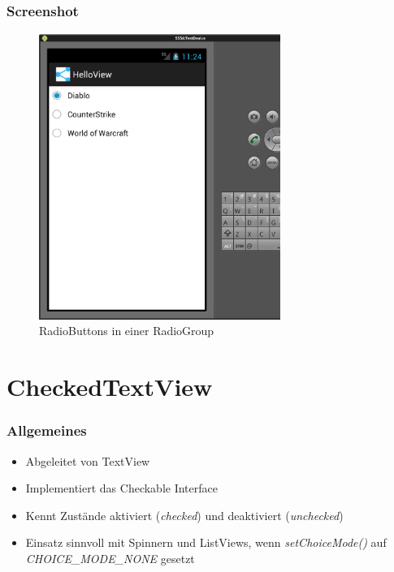 \begin{frame}
   \frametitle{Screenshot}
	\begin{figure}[h!]
	  \centering
	  \includegraphics[width=0.7\textwidth]{pictures/radio_group.ps}
	  \caption{
		  RadioButtons in einer RadioGroup
	  }
	  \label{fig:radio_group}
	\end{figure}
\end{frame}

\section{CheckedTextView}
\begin{frame}
   \frametitle{Allgemeines}
   \begin{itemize}
      \item Abgeleitet von TextView
      \item Implementiert das Checkable Interface
      \item Kennt Zustände aktiviert (\emph{checked}) und deaktiviert (\emph{unchecked})
      \item Einsatz sinnvoll mit Spinnern und ListViews, wenn \emph{setChoiceMode()} 
      	auf \emph{CHOICE\_MODE\_NONE} gesetzt
   \end{itemize}
   
	
\end{frame}


